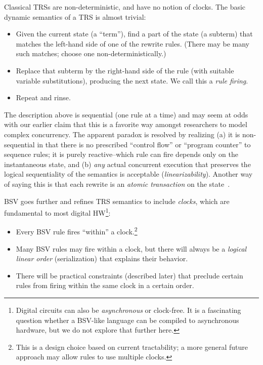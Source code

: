 \documentclass[11pt]{article}
\begin{document}
Classical TRSs are non-deterministic, and have no notion of clocks.
The basic dynamic semantics of a TRS is almost trivial:
\begin{itemize}

\item Given the current state (a ``term''), find a part of the state
(a subterm) that matches the left-hand side of one of the rewrite
rules.  (There may be many such matches; choose one non-deterministically.)

\item Replace that subterm by the right-hand side of the rule (with
suitable variable substitutions), producing the next state.  We call
this a \emph{rule firing}.

\item Repeat and rinse.

\end{itemize}

\noindent The description above is sequential (one rule at a time) and
may seem at odds with our earlier claim that this is a favorite way
amongst researchers to model complex concurrency.  The apparent
paradox is resolved by realizing (a) it is non-sequential in that
there is no prescribed ``control flow'' or ``program counter'' to
sequence rules; it is purely reactive--which rule can fire depends
only on the instantaneous state, and (b) \emph{any} actual concurrent
execution that preserves the logical sequentiality of the semantics is
acceptable (\emph{linearizability}).  Another way of saying this is
that each rewrite is an \emph{atomic transaction} on the
state~\cite{Lampson81}.

BSV goes further and refines TRS semantics to include \emph{clocks},
which are fundamental to most digital HW\footnote{Digital circuits can
also be \emph{asynchronous} or clock-free.  It is a fascinating
question whether a BSV-like language can be compiled to asynchronous
hardware, but we do not explore that further here.}:

\begin{itemize}

\item Every BSV rule fires ``within'' a clock.\footnote{This is a
design choice based on current tractability; a more general future
approach may allow rules to use multiple clocks.}

\item Many BSV rules may fire within a clock, but there will always be
a \emph{logical linear order} (serialization) that explains their behavior.

\item There will be practical constraints (described later) that
preclude certain rules from firing within the same clock in a certain
order.

\end{itemize}
\end{document}
